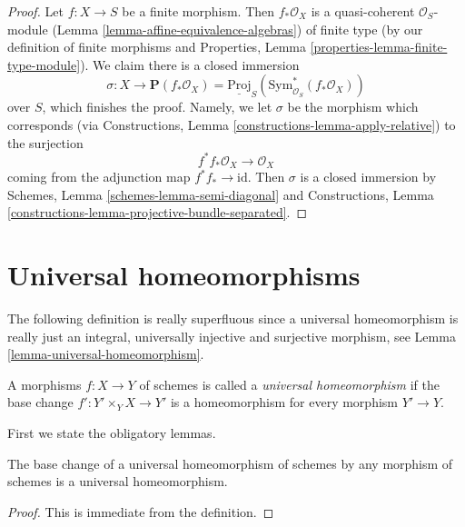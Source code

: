 \begin{proof}
Let $f : X \to S$ be a finite morphism. Then $f_*\mathcal{O}_X$ is
a quasi-coherent $\mathcal{O}_S$-module
(Lemma \ref{lemma-affine-equivalence-algebras})
of finite type
(by our definition of finite morphisms and
Properties, Lemma \ref{properties-lemma-finite-type-module}).
We claim there is a closed immersion
$$
\sigma :
X
\longrightarrow
\mathbf{P}(f_*\mathcal{O}_X) =
\underline{\text{Proj}}_S(\text{Sym}^*_{\mathcal{O}_S}(f_*\mathcal{O}_X))
$$
over $S$, which finishes
the proof. Namely, we let $\sigma$ be the morphism which corresponds
(via Constructions, Lemma \ref{constructions-lemma-apply-relative})
to the surjection
$$
f^*f_*\mathcal{O}_X \longrightarrow \mathcal{O}_X
$$
coming from the adjunction map $f^*f_* \to \text{id}$. Then $\sigma$
is a closed immersion by
Schemes, Lemma \ref{schemes-lemma-semi-diagonal} and
Constructions, Lemma \ref{constructions-lemma-projective-bundle-separated}.
\end{proof}







\section{Universal homeomorphisms}
\label{section-universal-homeomorphisms}

\noindent
The following definition is really superfluous since a universal
homeomorphism is really just an integral, universally injective
and surjective morphism, see
Lemma \ref{lemma-universal-homeomorphism}.

\begin{definition}
\label{definition-universal-homeomorphism}
A morphisms $f : X \to Y$ of schemes is called a {\it universal homeomorphism}
if the base change $f' : Y' \times_Y X \to Y'$ is a homeomorphism for
every morphism $Y' \to Y$.
\end{definition}

\noindent
First we state the obligatory lemmas.

\begin{lemma}
\label{lemma-base-change-universal-homeomorphism}
The base change of a universal homeomorphism of schemes
by any morphism of schemes is a universal homeomorphism.
\end{lemma}

\begin{proof}
This is immediate from the definition.
\end{proof}

